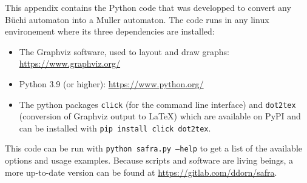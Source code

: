 This appendix contains the Python code that was developped to convert
any Büchi automaton into a Muller automaton.
The code runs in any linux environement where its three dependencies are installed:
\begin{itemize}
    \item The Graphviz software, used to layout and draw graphs: \url{https://www.graphviz.org/}
    \item Python 3.9 (or higher): \url{https://www.python.org/}
    \item The python packages \texttt{click} (for the command line interface) and \texttt{dot2tex} (conversion of Graphviz output to \LaTeX{})
        which are available on PyPI
        and can be installed with \texttt{pip install click dot2tex}.
\end{itemize}

This code can be run with \texttt{python safra.py --help} to get a list of the available options
and usage examples. Because scripts and software are living beings, a more up-to-date
version can be found at \url{https://gitlab.com/ddorn/safra}.

\inputminted[fontsize=\tiny]{python}{./safra_for_tex.py}


\newpage
\nocite{*}



